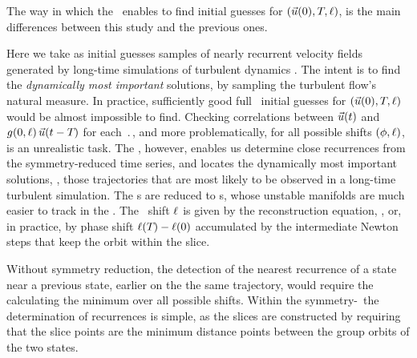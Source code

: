 The way in which the \mslices\ enables to find initial
guesses for $(\vec{u}(0),{T_{}},\ell)$, is the main differences
between this study and the previous ones.

Here we take as initial guesses samples of nearly recurrent velocity
fields generated by long-time simulations of turbulent dynamics
. The intent is to find the {\em dynamically most
important} solutions, by sampling the turbulent flow's natural measure.
In practice, sufficiently good full \statesp\ initial guesses for
$(\vec{u}(0),{T_{}},\ell)$ would be almost impossible to find.
Checking correlations between $\vec{u}(t)$ and
$g(0,\ell)\,\vec{u}(t-{T_{}})$ for each $\period{}$, and
more problematically, for all possible shifts $(\phi,\ell)$, is an
unrealistic task. The \mslices, however, enables us determine close
recurrences  from the symmetry-reduced time series, and locates the
dynamically most important solutions, \ie, those trajectories that are
most likely to be observed in a long-time turbulent simulation. The \rpo
s are reduced to \po s, whose unstable manifolds are much easier to track
in the \reducedsp. The \rpo\ shift $\ell$ is given by the
reconstruction equation, , or, in practice, by phase
shift $\ell({T_{}})-\ell(0)$ accumulated by the intermediate
Newton steps that keep the orbit within the slice.

Without symmetry reduction, the detection of the nearest recurrence of a
state near a previous state, earlier on the the same trajectory, would
require the calculating the minimum over all possible shifts. Within the
symmetry-\reducedsp\ the determination of recurrences is simple, as the
slices are constructed by requiring that the slice points are the minimum
distance points between the group orbits of the two states.
